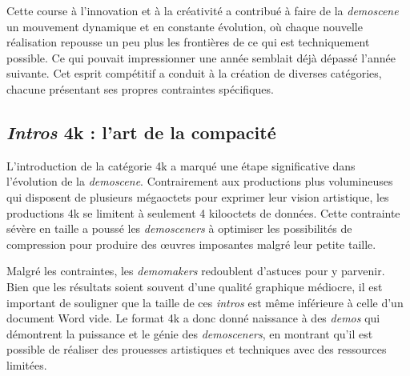 Cette course à l'innovation et à la créativité a contribué à faire de la \textit{demoscene} un mouvement dynamique et en constante évolution, où chaque nouvelle réalisation repousse un peu plus les frontières de ce qui est techniquement possible. Ce qui pouvait impressionner une année semblait déjà dépassé l'année suivante.  Cet esprit compétitif a conduit à la création de diverses catégories, chacune présentant ses propres contraintes spécifiques.

\subsection*{\textit{Intros} 4k : l'art de la compacité}

L'introduction de la catégorie 4k a marqué une étape significative dans l'évolution de la \textit{demoscene}. Contrairement aux productions plus volumineuses qui disposent de plusieurs mégaoctets pour exprimer leur vision artistique, les productions 4k se limitent à seulement 4 kilooctets de données. Cette contrainte sévère en taille a poussé les \textit{demosceners} à optimiser les possibilités de compression pour produire des œuvres imposantes malgré leur petite taille.

Malgré les contraintes, les \textit{demomakers} redoublent d'astuces pour y parvenir. Bien que les résultats soient souvent d'une qualité graphique médiocre, il est important de souligner que la taille de ces \textit{intros} est même inférieure à celle d'un document Word vide. Le format 4k a donc donné naissance à des \textit{demos} qui démontrent la puissance et le génie des \textit{demosceners}, en montrant qu'il est possible de réaliser des prouesses artistiques et techniques avec des ressources limitées.

